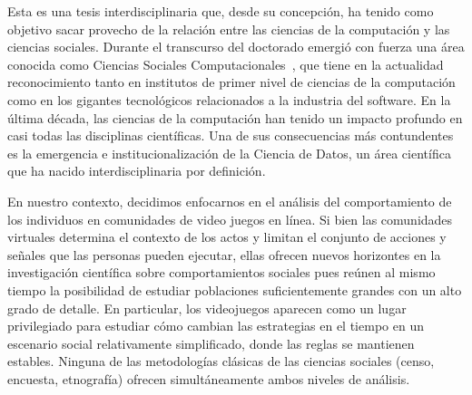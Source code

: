 \documentclass[a4paper,11pt]{book}
\theoremstyle{definition}
\begin{document}

Esta es una tesis interdisciplinaria que, desde su concepción, ha tenido como objetivo sacar provecho de la relación entre las ciencias de la computación y las ciencias sociales.
%
Durante el transcurso del doctorado emergió con fuerza una área conocida como Ciencias Sociales Computacionales~\cite{lazer2009-computationalSocialScience, lazer2020-computationalSocialScience}, que tiene en la actualidad reconocimiento tanto en institutos de primer nivel de ciencias de la computación como en los gigantes tecnológicos relacionados a la industria del software.
%
%
%
En la última década, las ciencias de la computación han tenido un impacto profundo en casi todas las disciplinas científicas.%
%
Una de sus consecuencias más contundentes es la emergencia e institucionalización de la Ciencia de Datos, un área científica que ha nacido interdisciplinaria por definición.


En nuestro contexto, decidimos enfocarnos en el análisis del comportamiento de los individuos en comunidades de video juegos en línea.
%
Si bien las comunidades virtuales determina el contexto de los actos y limitan el conjunto de acciones y se\~nales que las personas pueden ejecutar, ellas ofrecen nuevos horizontes en la investigación científica sobre comportamientos sociales pues reúnen al mismo tiempo la posibilidad de estudiar poblaciones suficientemente grandes con un alto grado de detalle.
%
En particular, los videojuegos aparecen como un lugar privilegiado para estudiar cómo cambian las estrategias en el tiempo en un escenario social relativamente simplificado, donde las reglas se mantienen estables.
%
Ninguna de las metodologías clásicas de las ciencias sociales (censo, encuesta, etnografía) ofrecen simultáneamente ambos niveles de análisis.

\end{document}
